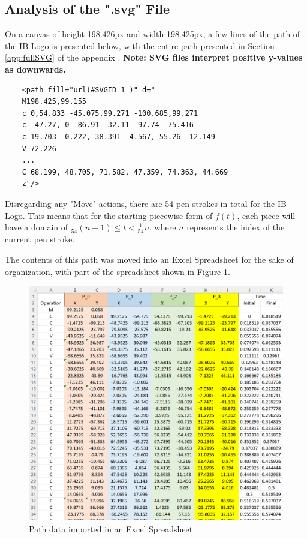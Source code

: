 \documentclass[letterpaper, 12pt]{article}
\begin{document}
\subsection{Analysis of the ".svg" File}

On a canvas of height 198.426px and width 198.425px,
a few lines of the path of the IB Logo is presented below,
with the entire path presented in Section \ref*{app:fullSVG}
of the appendix
\cite{internationalbaccalaureateorganisationInternationalBaccalaureateLogo2013}. \textbf{Note: SVG files interpret positive y-values as downwards.}

\begin{verbatim}
    <path fill="url(#SVGID_1_)" d="
    M198.425,99.155
    c 0,54.833 -45.075,99.271 -100.685,99.271
    c -47.27, 0 -86.91 -32.11 -97.74 -75.416
    c 19.703 -0.222, 38.391 -4.567, 55.26 -12.149
    V 72.226
    ...
    C 68.199, 48.705, 71.582, 47.359, 74.363, 44.669
    z"/>
\end{verbatim}

Disregarding any "Move" actions, there are 54 pen strokes
in total for the IB Logo. This means that for the starting piecewise
form of \(f(t)\), each piece will have a domain of \(\frac{1}{54}(n-1) \le t < \frac{1}{54}n\),
where \(n\) represents the index of the current pen stroke.

The contents of this path was moved into an Excel Spreadsheet for
the sake of organization, with part of the spreadsheet shown
in Figure \ref*{fig:svgxlsx}.

\begin{figure}[H]
    \centering
    \includegraphics[width=\textwidth]{svgxlsx.png}
    \caption{Path data imported in an Excel Spreadsheet}
    \label{fig:svgxlsx}
\end{figure}
\end{document}
